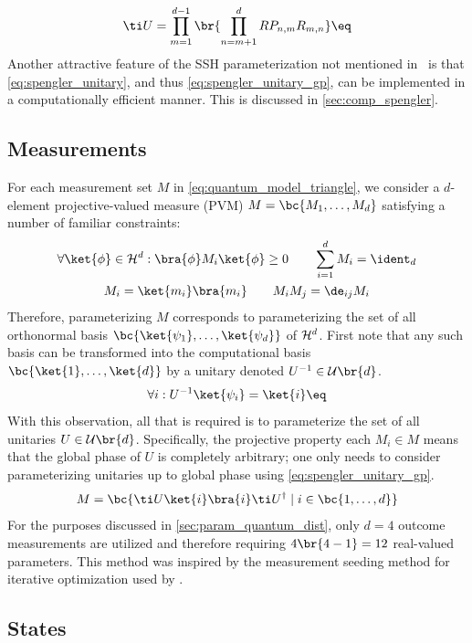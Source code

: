 \documentclass[aps, 10pt, english, twoside, pra, nofootinbib, tightenlines, longbibliography, superscriptaddress]{revtex4-1}
\begin{document}
    \[ \ti U = \prod_{m=1}^{d-1} \br{\prod_{n=m+1}^{d} RP_{n,m}R_{m,n}} \eq \label{eq:spengler_unitary_gp} \]
    Another attractive feature of the SSH parameterization not mentioned in~\cite{Spengler_2010_Unitary} is that \cref{eq:spengler_unitary}, and thus \cref{eq:spengler_unitary_gp}, can be implemented in a computationally efficient manner. This is discussed in \cref{sec:comp_spengler}.
    \subsection{Measurements}
    \label{sec:measurements}
    For each measurement set $M$ in \cref{eq:quantum_model_triangle}, we consider a $d$-element projective-valued measure (PVM) $M = \bc{M_1, \ldots, M_d}$ satisfying a number of familiar constraints:
    \begin{gather*}
    \forall \ket{\phi} \in \Hilb^d: \bra{\phi} M_i \ket{\phi} \geq 0 \qquad \sum_{i=1}^{d} M_i = \ident_{d} \\
    M_i = \ket{m_i}\bra{m_i} \qquad M_i M_j = \de_{ij} M_i
    \end{gather*}
    Therefore, parameterizing $M$ corresponds to parameterizing the set of all orthonormal basis $\bc{\ket{\psi_1}, \ldots, \ket{\psi_d}}$ of $\mathcal{H}^d$.
    First note that any such basis can be transformed into the computational basis $\bc{\ket{1}, \ldots, \ket{d}}$ by a unitary denoted $U^{-1} \in \mathcal{U}\br{d}$.
    \[ \forall i : U^{-1} \ket{\psi_i} = \ket{i} \eq \label{eq:unitary_transform}\]
    With this observation, all that is required is to parameterize the set of all unitaries $U \in \mathcal{U}\br{d}$. Specifically, the projective property each $M_i \in M$ means that the global phase of $U$ is completely arbitrary; one only needs to consider parameterizing unitaries up to global phase using \cref{eq:spengler_unitary_gp}.
    \[ M = \bc{\ti U \ket{i} \bra{i} \ti U^{\dagger} \mid i \in \bc{1, \ldots, d}} \]
    For the purposes discussed in \cref{sec:param_quantum_dist}, only $d = 4$ outcome measurements are utilized and therefore requiring $4\br{4 - 1} = 12$ real-valued parameters. This method was inspired by the measurement seeding method for iterative optimization used by \citet{Pal_2010} .
    \subsection{States}
    \label{sec:states}
\end{document}
